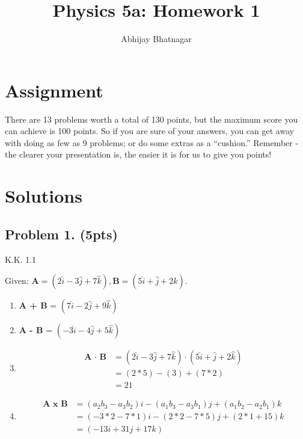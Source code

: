 \documentclass[11pt, notitlepage]{report}
\makeatletter
\newcommand*{\toccontents}{\@starttoc{toc}}
\makeatother
\begin{document}
   \title{Physics 5a: Homework 1}
   \author{Abhijay Bhatnagar}
   \maketitle
   \toccontents



\setcounter{secnumdepth}{0} %
\section{Assignment}

\hfill There are 13 problems worth a total of 130 points, but the maximum score you can achieve is 100 points.  So if you are sure of your answers, you can get away with doing as few as 9 problems; or do some extras as a “cushion.”  Remember - the clearer your presentation is, the easier it is for us to give you points!

\section{Solutions}


\subsection{Problem 1. (5pts)}

K.K. 1.1

\vskip 0.1in

Given: $\textbf{A} = (2\hat{i}-3\hat{j}+7\hat{k}), \textbf{B} = (5\hat{i}+\hat{j}+2\hat{k}). $

\vskip 0.3in

\begin{enumerate}[label=(\alph*)]
	\item \textbf{A + B} = $(7\hat{i}-2\hat{j}+9\hat{k})$
	\item \textbf{A - B} = $(-3\hat{i}-4\hat{j}+5\hat{k})$
	\item 
		\begin{align}
		\textbf{A $\cdot$ B} &= (2\hat{i}-3\hat{j}+7\hat{k}) \cdot (5\hat{i}+\hat{j}+2\hat{k}) \\ 
		&= (2*5)-(3) + (7*2) \\
		&= 21
		\end{align}
	\item \begin{align}
		\textbf{A x B} &= (a_2b_3-a_3b_2)i-(a_1b_3-a_3b_1)j+(a_1b_2-a_2b_1)k \\
		&= (-3*2-7*1)i-(2*2-7*5)j+(2*1+15)k \\
		&= (-13i+31j+17k)
	\end{align}
\end{enumerate}
\end{document}
